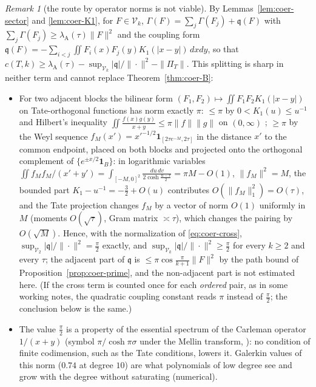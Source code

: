 \documentclass[11pt]{amsart}
\theoremstyle{definition}
\theoremstyle{remark}
\newtheorem{remark}[theorem]{Remark}
\newcommand{\PiT}{\Pi_T}
\begin{document}
\begin{remark}[the route by operator norms is not viable]\label{rem:coer-nogo}
By Lemmas~\ref{lem:coer-sector} and \ref{lem:coer-K1}, for $F\in\mathcal V_k$,
$\Gamma(F)=\sum_j\Gamma(F_j)+\mathfrak q(F)$ with $\sum_j\Gamma(F_j)\ge\lambda_{\mathrm A}(\tau)\|F\|^2$ and the coupling form
$\mathfrak q(F)=-\sum_{i<j}\iint F_i(x)F_j(y)K_1(|x-y|)\,dxdy$, so that
$c(T,k)\ge\lambda_{\mathrm A}(\tau)-\sup_{\mathcal V_k}|\mathfrak q|/\|\cdot\|^2-\|\PiT\|$. This splitting is sharp in neither
term and cannot replace Theorem~\ref{thm:coer-B}:
\begin{itemize}
\item[(a)] For two adjacent blocks the bilinear form $(F_1,F_2)\mapsto\iint F_1F_2K_1(|x-y|)$ on Tate-orthogonal
functions has norm exactly $\pi$: $\le\pi$ by $0<K_1(u)\le u^{-1}$ and Hilbert's inequality
$\iint\frac{f(x)g(y)}{x+y}\le\pi\|f\|\|g\|$ on $(0,\infty)$ \cite[Thm.~316]{HLP}; $\ge\pi$ by the Weyl sequence
$f_M(x')=x'^{-1/2}\mathbf 1_{[2\tau e^{-M},2\tau]}$ in the distance $x'$ to the common endpoint, placed on both blocks and
projected onto the orthogonal complement of $\{e^{\pm x/2}\mathbf 1_B\}$: in logarithmic variables
$\iint f_Mf_M/(x'+y')=\int_{[-M,0]^2}\frac{du\,dv}{2\cosh\frac{u-v}2}=\pi M-O(1)$, $\|f_M\|^2=M$, the bounded part
$K_1-u^{-1}=-\frac32+O(u)$ contributes $O(\|f_M\|_1^2)=O(\tau)$, and the Tate projection changes $f_M$ by a vector of norm
$O(1)$ uniformly in $M$ (moments $O(\sqrt\tau)$, Gram matrix $\asymp\tau$), which changes the pairing by $O(\sqrt M)$.
Hence, with the normalization of \eqref{eq:coer-cross}, $\sup_{\mathcal V_2}|\mathfrak q|/\|\cdot\|^2=\frac\pi2$ exactly, and
$\sup_{\mathcal V_k}|\mathfrak q|/\|\cdot\|^2\ge\frac\pi2$ for every $k\ge2$ and every $\tau$; the adjacent part of
$\mathfrak q$ is $\le\pi\cos\frac\pi{k+1}\|F\|^2$ by the path bound of Proposition~\ref{prop:coer-prime}, and the
non-adjacent part is not estimated here. (If the cross term is counted once for each \emph{ordered} pair, as in some
working notes, the quadratic coupling constant reads $\pi$ instead of $\frac\pi2$; the conclusion below is the same.)
\item[(b)] The value $\frac\pi2$ is a property of the essential spectrum of the Carleman operator $1/(x+y)$ (symbol
$\pi/\cosh\pi\sigma$ under the Mellin transform, \cite{Carleman1923}): no condition of finite codimension, such as the
Tate conditions, lowers it. Galerkin values of this norm ($0.74$ at degree $10$) are what polynomials of low degree see
and grow with the degree without saturating (numerical).

\end{itemize}
\end{remark}
\end{document}
